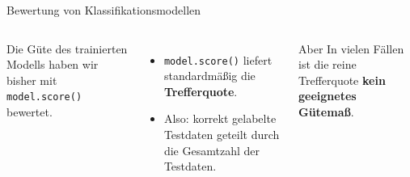 
\begin{frame}{Bewertung von Klassifikationsmodellen}
\begin{columns}
Die Güte des trainierten Modells haben wir bisher mit \texttt{model.score()}
bewertet.

\vspace{0.4em}
\begin{itemize}
  \item \texttt{model.score()} liefert standardmäßig die
        \textbf{Trefferquote}.
  \item Also: korrekt gelabelte Testdaten geteilt durch die Gesamtzahl der
        Testdaten.
\end{itemize}

\vspace{0.4em}
\begin{block}{Aber}
In vielen Fällen ist die reine Trefferquote \textbf{kein geeignetes
Gütemaß}.
\end{block}

\centering
{}
\end{columns}
\end{frame}


